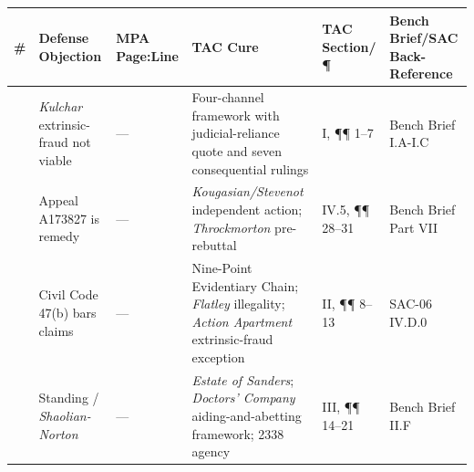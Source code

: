 {\def\LTcaptype{table} %
\begin{longtable}[]{@{}
  >{\raggedright\arraybackslash}p{}
  >{\raggedright\arraybackslash}p{}
  >{\raggedright\arraybackslash}p{}
  >{\raggedright\arraybackslash}p{}
  >{\raggedright\arraybackslash}p{}
  >{\raggedright\arraybackslash}p{}@{}}
\toprule\noalign{}
\begin{minipage}[b]{\linewidth}\raggedright
\#
\end{minipage} & \begin{minipage}[b]{\linewidth}\raggedright
Defense Objection
\end{minipage} & \begin{minipage}[b]{\linewidth}\raggedright
MPA Page:Line
\end{minipage} & \begin{minipage}[b]{\linewidth}\raggedright
TAC Cure
\end{minipage} & \begin{minipage}[b]{\linewidth}\raggedright
TAC Section/¶
\end{minipage} & \begin{minipage}[b]{\linewidth}\raggedright
Bench Brief/SAC Back-Reference
\end{minipage} \\
\midrule\noalign{}
\endhead
\bottomrule\noalign{}
\endlastfoot
1 & \emph{Kulchar} extrinsic-fraud not viable & --- & Four-channel framework with judicial-reliance quote and seven consequential rulings & \textsection{}I, ¶¶ 1--7 & Bench Brief \textsection{}I.A-I.C \\
2 & Appeal A173827 is remedy & --- & \emph{Kougasian/Stevenot} independent action; \emph{Throckmorton} pre-rebuttal & \textsection{}IV.5, ¶¶ 28--31 & Bench Brief Part VII \\
3 & Civil Code \textsection{} 47(b) bars claims & --- & Nine-Point Evidentiary Chain; \emph{Flatley} illegality; \emph{Action Apartment} extrinsic-fraud exception & \textsection{}II, ¶¶ 8--13 & SAC-06 \textsection{}IV.D.0 \\
4 & Standing / \emph{Shaolian-Norton} & --- & \emph{Estate of Sanders}; \emph{Doctors' Company} aiding-and-abetting framework; \textsection{} 2338 agency & \textsection{}III, ¶¶ 14--21 & Bench Brief \textsection{}II.F \\

\end{longtable}}
